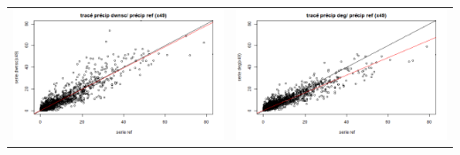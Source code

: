 \documentclass[a4paper,11pt]{article}
\begin{document}
\hspace{-1cm}
\begin{tabular}{cc}
	\includegraphics[scale=0.4]{images/pr_3_ds.png} & \includegraphics[scale=0.4]{images/pr_3_dg.png}   \\

\end{tabular}
\end{document}
